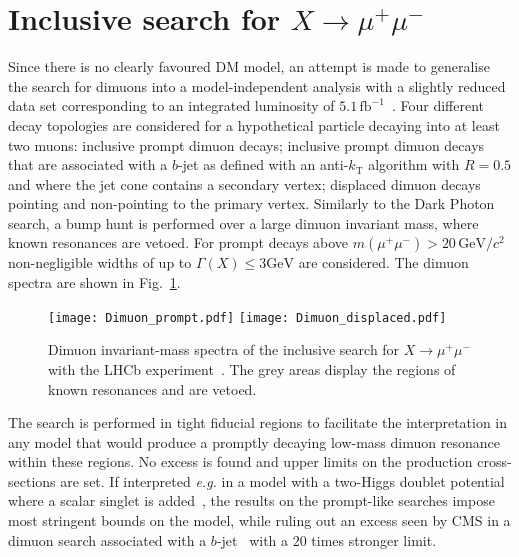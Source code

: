 \documentclass[a4paper,11pt]{article}
\begin{document}
\section{Inclusive search for \boldmath$X\to\mu^+\mu^-$}
Since there is no clearly favoured DM model, an attempt is made to generalise the search for dimuons into a model-independent analysis with a slightly reduced data set corresponding to an integrated luminosity of $5.1\,\text{fb}^{-1}$~\cite{Xmumu}. Four different decay topologies are considered for a hypothetical particle decaying into at least two muons: inclusive prompt dimuon decays; inclusive prompt dimuon decays that are associated with a $b$-jet as defined with an anti-$k_\text{T}$ algorithm with $R=0.5$ and where the jet cone contains a secondary vertex; displaced dimuon decays pointing and non-pointing to the primary vertex.
Similarly to the Dark Photon search, a bump hunt is performed over a large dimuon invariant mass, where known resonances are vetoed. For prompt decays above $m(\mu^+\mu^-)>20\,\text{GeV}/c^2$ non-negligible widths of up to $\Gamma(X)\leq3\text{GeV}$ are considered. The dimuon spectra are shown in Fig.~\ref{fig:dimuon_spectra}.
\begin{figure}
\centering
\texttt{[image: Dimuon\_prompt.pdf]}
\texttt{[image: Dimuon\_displaced.pdf]}
\caption{Dimuon invariant-mass spectra of the inclusive search for $X\to\mu^+\mu^-$ with the LHCb experiment~\cite{Xmumu}. The grey areas display the regions of known resonances and are vetoed.}
\label{fig:dimuon_spectra}
\end{figure}

The search is performed in tight fiducial regions to facilitate the interpretation in any model that would produce a promptly decaying low-mass dimuon resonance within these regions. No excess is found and upper limits on the production cross-sections are set.
If interpreted \textit{e.g.} in a model with a two-Higgs doublet potential where a scalar singlet is added~\cite{2HDM}, the results on the prompt-like searches impose most stringent bounds on the model, while ruling out an excess seen by CMS in a dimuon search associated with a $b$-jet~\cite{CMS_mmb} with a $20$ times stronger limit.
\end{document}
